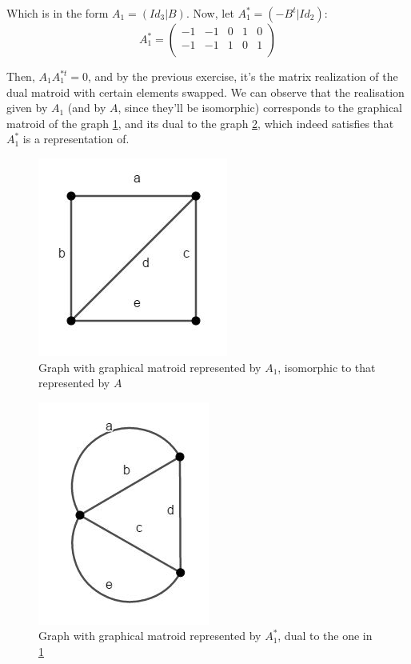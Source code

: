 \documentclass[12pt]{article}
\begin{document}
 Which is in the form $A_{1} = (Id_{3} | B)$. Now, let $A_{1}^{*} = (-B^{t} | Id_{2})$:  $$A_{1}^{*} = \left( {\begin{array}{ccccc}
   -1 & -1 & 0 & 1 & 0\\
   -1 & -1 & 1 & 0 & 1\\
  \end{array} } \right)$$
  
Then, $A_{1}A_{1}^{*t} = 0$, and by the previous exercise, it's the matrix realization of the dual matroid with certain elements swapped. We can observe that the realisation given by $A_{1}$ (and by $A$, since they'll be isomorphic) corresponds to the graphical matroid of the graph \ref{figura1}, and its dual to the graph \ref{figura2}, which indeed satisfies that $A_{1}^{*}$ is a representation of.

\begin{figure}
    \centering
    \includegraphics{figures/figura1.JPG}
    \caption{Graph with graphical matroid represented by $A_{1}$, isomorphic to that represented by $A$}
    \label{figura1}
\end{figure}

\begin{figure}
    \centering
    \includegraphics{figures/figura2.JPG}
    \caption{Graph with graphical matroid represented by $A_{1}^{*}$, dual to the one in \ref{figura1}}
    \label{figura2}
\end{figure}
\end{document}
